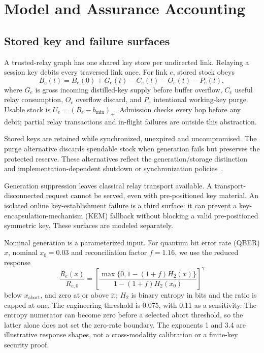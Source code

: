 \documentclass[conference,a4paper]{IEEEtran}
\begin{document}
\section{Model and Assurance Accounting}\label{sec:model}
\subsection{Stored key and failure surfaces}
A trusted-relay graph has one shared key store per undirected link. Relaying a session key debits every traversed link once. For link $e$, stored stock obeys
\begin{equation}\label{eq:stock}
B_e(t)=B_e(0)+G_e(t)-C_e(t)-O_e(t)-P_e(t),
\end{equation}
where $G_e$ is gross incoming distilled-key supply before buffer overflow, $C_e$ useful relay consumption, $O_e$ overflow discard, and $P_e$ intentional working-key purge. Usable stock is $U_e=(B_e-b_{\min})_+$. Admission checks every hop before any debit; partial relay transactions and in-flight failures are outside this abstraction.

Stored keys are retained while synchronized, unexpired and uncompromised. The purge alternative discards spendable stock when generation fails but preserves the protected reserve. These alternatives reflect the generation/storage distinction~\cite{itu} and implementation-dependent shutdown or synchronization policies~\cite{tysowski}.

Generation suppression leaves classical relay transport available. A transport-disconnected request cannot be served, even with pre-positioned key material. An isolated online key-establishment failure is a third surface: it can prevent a key-encapsulation-mechanism (KEM) fallback without blocking a valid pre-positioned symmetric key. These surfaces are modeled separately.

Nominal generation is a parameterized input. For quantum bit error rate (QBER) $x$, nominal $x_0=0.03$ and reconciliation factor $f=1.16$, we use the reduced response
\begin{equation}\label{eq:rate}
\frac{R_e(x)}{R_{e,0}}=\left[\frac{\max\{0,1-(1+f)H_2(x)\}}{1-(1+f)H_2(x_0)}\right]^{\gamma}
\end{equation}
below $x_{\mathrm{abort}}$, and zero at or above it; $H_2$ is binary entropy in bits and the ratio is capped at one. The engineering threshold is 0.075, with 0.11 as a sensitivity. The entropy numerator can become zero before a selected abort threshold, so the latter alone does not set the zero-rate boundary. The exponents 1 and 3.4 are illustrative response shapes, not a cross-modality calibration or a finite-key security proof.
\end{document}
